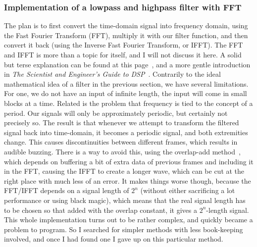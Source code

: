 \documentclass[11pt,a4paper]{article}
\begin{document}
\begin{figure}
\end{figure}

\subsubsection{Implementation of a lowpass and highpass filter with FFT}

The plan is to first convert the time-domain signal into frequency domain, using the Fast Fourier Transform (FFT), multiply it with our filter function, and then convert it back (using the Inverse Fast Fourier Transform, or IFFT). The FFT and IFFT is more than a topic for itself, and I will not discuss it here. A solid but terse explanation can be found at this page~\cite{DITFFT}, and a more gentle introduction in \emph{The Scientist and Engineer's Guide to DSP}~\cite[chap. 12]{SmithDSP}. Contrarily to the ideal mathematical idea of a filter in the previous section, we have several limitations. For one, we do not have an input of infinite length, the input will come in small blocks at a time. Related is the problem that frequency is tied to the concept of a period. Our signals will only be approximately periodic, but certainly not precisely so.
The result is that whenever we attempt to transform the filtered signal back into time-domain, it becomes a periodic signal, and both extremities change. This causes discontinuities between different frames, which results in audible buzzing. There is a way to avoid this, using the overlap-add method~\cite{Overlapadd}, which depends on buffering a bit of extra data of previous frames and including it in the FFT, causing the IFFT to create a longer wave, which can be cut at the right place with much less of an error.
It makes things worse though, because the FFT/IFFT depends on a signal length of $2^n$ (without either sacrificing a lot performance or using black magic), which means that the real signal length has to be chosen so that added with the overlap constant, it gives a $2^n$-length signal. This whole implementation turns out to be rather complex, and quickly became a problem to program. So I searched for simpler methods with less book-keeping involved, and once I had found one I gave up on this particular method.
\end{document}
